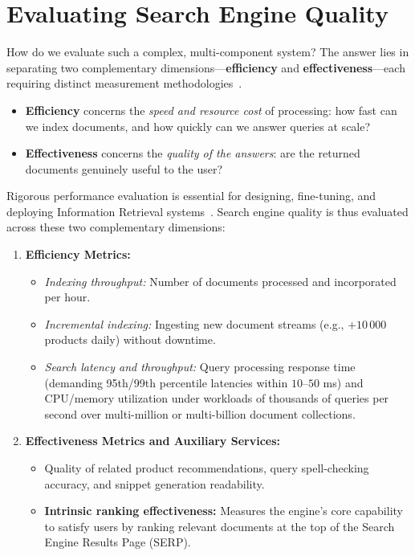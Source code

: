 \FloatBarrier
\section{Evaluating Search Engine Quality}

How do we evaluate such a complex, multi-component system? The answer lies in separating two complementary dimensions—\textbf{efficiency} and \textbf{effectiveness}—each requiring distinct measurement methodologies~\cite{manning2008,buttcher2010}.

\begin{itemize}
    \item \textbf{Efficiency} concerns the \emph{speed and resource cost} of processing: how fast can we index documents, and how quickly can we answer queries at scale?
    \item \textbf{Effectiveness} concerns the \emph{quality of the answers}: are the returned documents genuinely useful to the user?
\end{itemize}

Rigorous performance evaluation is essential for designing, fine-tuning, and deploying Information Retrieval systems~\cite{manning2008,buttcher2010}. Search engine quality is thus evaluated across these two complementary dimensions:
\begin{enumerate}
    \item \textbf{Efficiency Metrics:}
    \begin{itemize}
        \item \textit{Indexing throughput:} Number of documents processed and incorporated per hour.
        \item \textit{Incremental indexing:} Ingesting new document streams (e.g., $+10\,000$ products daily) without downtime.
        \item \textit{Search latency and throughput:} Query processing response time (demanding 95th/99th percentile latencies within $10$--$50$ ms) and CPU/memory utilization under workloads of thousands of queries per second over multi-million or multi-billion document collections.
    \end{itemize}
    \item \textbf{Effectiveness Metrics and Auxiliary Services:}
    \begin{itemize}
        \item Quality of related product recommendations, query spell-checking accuracy, and snippet generation readability.
        \item \textbf{Intrinsic ranking effectiveness:} Measures the engine's core capability to satisfy users by ranking relevant documents at the top of the Search Engine Results Page (SERP).
    \end{itemize}
\end{enumerate}

